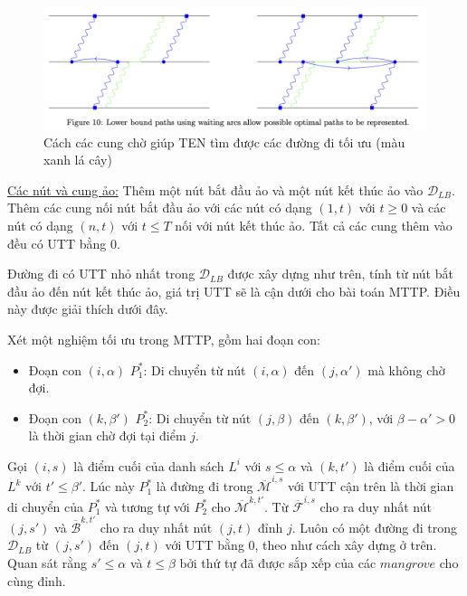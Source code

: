 \documentclass[../main.tex]{subfiles}
\begin{document}
\begin{figure}
\centering
\includegraphics{images/Figure10.png}
\caption{Cách các cung chờ giúp TEN tìm được các đường đi tối ưu
(màu xanh lá cây)}
\label{fig:10}
\end{figure}

\underline{Các nút và cung ảo:} Thêm một nút bắt đầu ảo và một nút kết thúc ảo vào
\(\mathcal D_{LB}\). Thêm các cung nối nút bắt đầu ảo với các nút có
dạng \((1,t)\) với \(t\geq 0\) và các nút có dạng \((n,t)\) với
\(t\leq T\) nối với nút kết thúc ảo. Tất cả các cung thêm vào đều có UTT
bằng \(0\).

Đường đi có UTT nhỏ nhất trong \(\mathcal D_{LB}\) được xây dựng như
trên, tính từ nút bắt đầu ảo đến nút kết thúc ảo, giá trị UTT sẽ là cận
dưới cho bài toán MTTP. Điều này được giải thích dưới đây.

Xét một nghiệm tối ưu trong MTTP, gồm hai đoạn con:

\begin{itemize}
\tightlist
\item

  Đoạn con \((i,\alpha)\) \(P_1^*\): Di chuyển từ nút \((i, \alpha)\)
  đến \((j, \alpha')\) mà không chờ đợi.
\item
  Đoạn con \((k,\beta')\) \(P_2^*\): Di chuyển từ nút \((j,\beta)\) đến
  \((k,\beta')\), với \(\beta -  \alpha' > 0\) là thời gian chờ đợi tại
  điểm \(j\).
\end{itemize}

Gọi \((i, s)\) là điểm cuối của danh sách \(L^i\) với \(s \leq \alpha\)
và \((k,t')\) là điểm cuối của \(L^k\) với \(t' \leq \beta'\). Lúc này
\(P_1^*\) là đường đi trong \(\overline{\mathcal M}^{i,s}\) với UTT cận trên
là thời gian di chuyển của \(P_1^*\) và tương tự với \(P_2^*\) cho
\(\overline{\mathcal M}^{k,t'}\). Từ \(\mathcal{\overline{F}}^{i,s}\) cho ra duy
nhất nút \((j, s')\) và \(\mathcal{\overline{B}}^{k,t'}\) cho ra duy nhất nút
\((j,t)\) đỉnh \(j\). Luôn có một đường đi trong \(\mathcal D_{LB}\) từ
\((j, s')\) đến \((j,t)\) với UTT bằng \(0\), theo như cách xây dựng ở
trên. Quan sát rằng \(s'\leq \alpha\) và \(t\leq \beta\) bởi thứ tự đã
được sắp xếp của các \(mangrove\) cho cùng đỉnh.
\end{document}
